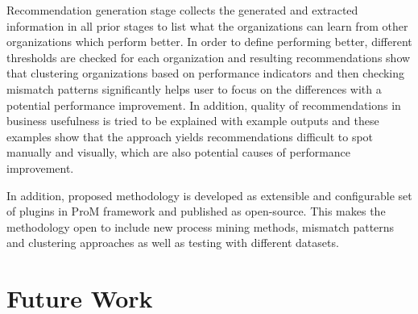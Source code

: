 Recommendation generation stage collects the generated and extracted information in all prior stages to list what the organizations can learn from other organizations which perform better. In order to define performing better, different thresholds are checked for each organization and resulting recommendations show that clustering organizations based on performance indicators and then checking mismatch patterns significantly helps user to focus on the differences with a potential performance improvement. In addition, quality of recommendations in business usefulness is tried to be explained with example outputs and these examples show that the approach yields recommendations difficult to spot manually and visually, which are also potential causes of performance improvement.

In addition, proposed methodology is developed as extensible and configurable set of plugins in ProM framework \cite{verbeek2010prom} and published as open-source. This makes the methodology open to include new process mining methods, mismatch patterns and clustering approaches as well as testing with different datasets.

\section{Future Work}

%
%
% 
% 
 
 